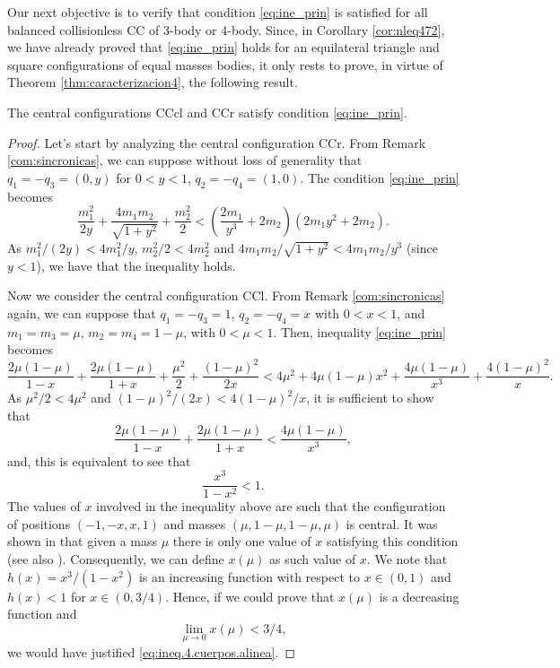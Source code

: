 \documentclass[smallcondensed]{svjour3}
\begin{document}
Our next objective is to verify that condition \eqref{eq:ine_prin} is satisfied for all balanced collisionless CC of 3-body or 4-body. Since,  in  Corollary \ref{cor:nleq472}, we have already proved that \eqref{eq:ine_prin} holds for an equilateral triangle and square configurations of equal masses bodies, it only rests to prove, in virtue of Theorem \ref{thm:caracterizacion4}, the following result.




\begin{theorem}\label{thm:CC.3.4.satis.cond.adm}
The central configurations CCcl and CCr satisfy condition \eqref{eq:ine_prin}.
\end{theorem}



\begin{proof}

Let's start by analyzing the central configuration CCr. From  Remark \ref{com:sincronicas}, we can suppose without loss of generality that $ q_1 = -q_3 = (0, y) $ for $ 0<y<1 $, $ q_2 = -q_4 = (1,0) $. The condition \eqref{eq:ine_prin} becomes
\[\frac{m_1^2}{2y}+\frac{4m_1m_2}{\sqrt{1+y^2}}+\frac{m_2^2}{2}<\left(\frac{2m_1}{y^3}+2m_2\right) \left(2m_1y^2+2m_2\right).\]
As $m_1^2/(2y)<4m_1^2/y$, $m_2^2/2<4m_2^2$ and $4m_1m_2/\sqrt{1+y^2}<4m_1m_2/y^3$ (since $y<1$), we have that the inequality holds.

 Now we consider the central configuration CCl. From Remark \ref{com:sincronicas} again, we can suppose  that $q_1=-q_3=1$, $q_2=-q_4=x$ with $0<x<1$, and $m_1=m_3=\mu$, $m_2=m_4=1-\mu$, with $0<\mu<1$.  Then, inequality \eqref{eq:ine_prin} becomes
\[\frac{2\mu(1-\mu)}{1-x} +\frac{2\mu(1-\mu)}{1+x}+\frac{\mu^2}{2}+\frac{(1-\mu)^2}{2x}<4\mu^2+4\mu(1-\mu)x^2+\frac{4\mu(1-\mu)}{x^3}+\frac{4(1-\mu)^2}{x}.\]
As $ \mu ^ 2/2 <4 \mu^2$ and $ (1-\mu)^2/(2x)< 4(1-\mu)^2/x $, it is sufficient to show that
\[\frac{2\mu(1-\mu)}{1-x} +\frac{2\mu(1-\mu)}{1+x}<\frac{4\mu(1-\mu)}{x^3},\]
and, this is equivalent to see that
\begin{equation}\label{eq:ineq.4.cuerpos.alinea}
\frac{x^3}{1-x^2}<1.
\end{equation}
The values of $x$ involved in the  inequality above are such that the configuration of positions $(-1,-x,x,1)$ and masses $(\mu,1-\mu,1-\mu,\mu)$ is central. It was shown in \cite{moulton1910straight} that given a mass $\mu$ there is only one value of $x$ satisfying this condition (see also \cite{shoaib2011collinear}). Consequently, we can define $x(\mu)$ as such value of $x$.  We note that $h(x)=x^3/(1-x^2)$ is an increasing function with respect to $x\in (0,1)$ and $h(x)< 1$ for $x\in (0,3/4)$. Hence, if we could prove that $x(\mu)$ is a decreasing function and
\begin{equation}\label{eq:ineq.4.cuerpos.lim0}
\lim\limits_{\mu\to 0}x(\mu)<3/4,
\end{equation}
we would have justified \eqref {eq:ineq.4.cuerpos.alinea}.


\end{proof}
\end{document}
